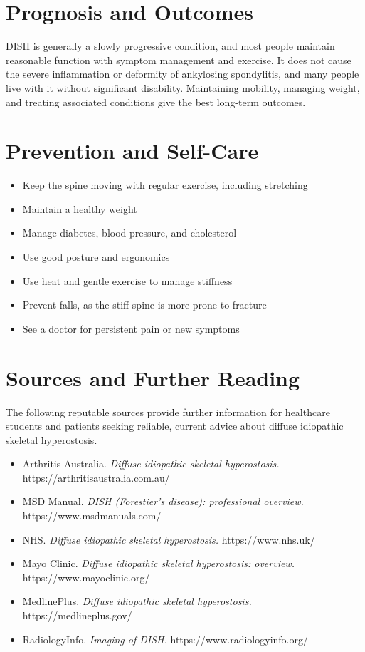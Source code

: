 \section*{Prognosis and Outcomes}
DISH is generally a slowly progressive condition, and most people maintain reasonable function with symptom management and exercise. It does not cause the severe inflammation or deformity of ankylosing spondylitis, and many people live with it without significant disability. Maintaining mobility, managing weight, and treating associated conditions give the best long-term outcomes.

\section*{Prevention and Self-Care}
\begin{itemize}
    \item Keep the spine moving with regular exercise, including stretching
    \item Maintain a healthy weight
    \item Manage diabetes, blood pressure, and cholesterol
    \item Use good posture and ergonomics
    \item Use heat and gentle exercise to manage stiffness
    \item Prevent falls, as the stiff spine is more prone to fracture
    \item See a doctor for persistent pain or new symptoms
\end{itemize}

\section*{Sources and Further Reading}
The following reputable sources provide further information for healthcare students and patients seeking reliable, current advice about diffuse idiopathic skeletal hyperostosis.

\begin{itemize}
    \item Arthritis Australia. \textit{Diffuse idiopathic skeletal hyperostosis.} https://arthritisaustralia.com.au/
    \item MSD Manual. \textit{DISH (Forestier's disease): professional overview.} https://www.msdmanuals.com/
    \item NHS. \textit{Diffuse idiopathic skeletal hyperostosis.} https://www.nhs.uk/
    \item Mayo Clinic. \textit{Diffuse idiopathic skeletal hyperostosis: overview.} https://www.mayoclinic.org/
    \item MedlinePlus. \textit{Diffuse idiopathic skeletal hyperostosis.} https://medlineplus.gov/
    \item RadiologyInfo. \textit{Imaging of DISH.} https://www.radiologyinfo.org/
\end{itemize}
